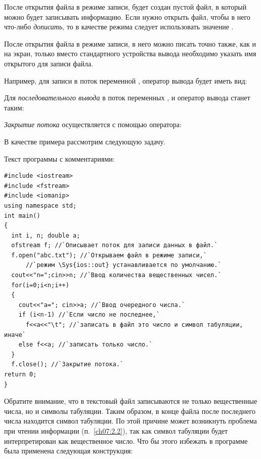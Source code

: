 После открытия файла в режиме записи, будет создан пустой файл, в который можно будет записывать информацию. Если нужно
открыть файл, чтобы в него что-либо \emph{дописать}, то в качестве режима следует использовать
значение .

После открытия файла в режиме записи, в него можно писать точно также, как и на экран, только вместо стандартного
устройства вывода  необходимо указать имя открытого для записи файла.

Например, для записи в поток  переменной , оператор вывода будет иметь вид:


Для \emph{последовательного вывода} в поток  переменных ,
 и  оператор вывода станет таким:


\emph{Закрытие потока} осуществляется с помощью оператора:


В качестве примера рассмотрим следующую задачу.


Текст программы с комментариями:
\begin{lstlisting}
#include <iostream>
#include <fstream>
#include <iomanip>
using namespace std;
int main()
{
  int i, n; double a;
  ofstream f; //`Описывает поток для записи данных в файл.`
  f.open("abc.txt"); //`Открываем файл в режиме записи,`
      //`режим \Sys{ios::out} устанавливается по умолчанию.`
  cout<<"n=";cin>>n; //`Ввод количества вещественных чисел.`
  for(i=0;i<n;i++)
  {
    cout<<"a="; cin>>a; //`Ввод очередного числа.`
    if (i<n-1) //`Если число не последнее,`
      f<<a<<"\t"; //`записать в файл это число и символ табуляции, иначе`
    else f<<a; //`записать только число.`
  }
  f.close(); //`Закрытие потока.`
return 0;
}
\end{lstlisting}

Обратите внимание, что в текстовый файл записываются не только вещественные числа, но и символы табуляции. Таким
образом, в конце файла после последнего числа находится символ табуляции. По этой причине может возникнуть проблема при
чтении информации (п.~\ref{ch07:2.2}), так как символ табуляции будет интерпретирован как вещественное число. Что бы этого
избежать в программе была применена следующая конструкция:


